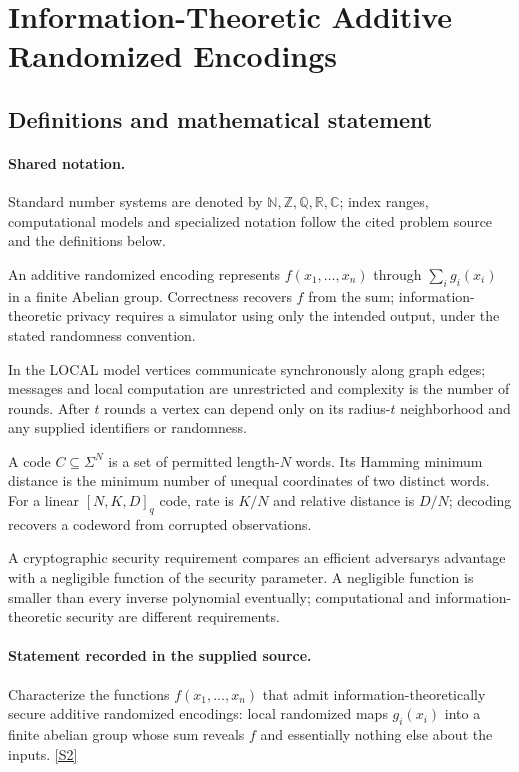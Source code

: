 \documentclass[11pt]{article}
\newcommand{\sref}[2]{\hyperlink{source:#1:#2}{[S#2]}}
\begin{document}
\section{Information-Theoretic Additive Randomized Encodings}\label{statement}

\subsection{Definitions and mathematical statement}

\paragraph{Shared notation.}Standard number systems are denoted by $\mathbb N,\mathbb Z,\mathbb Q,\mathbb R,\mathbb C$; index ranges, computational models and specialized notation follow the cited problem source and the definitions below.


An additive randomized encoding represents $f(x_1,\ldots,x_n)$ through $\sum_i g_i(x_i)$ in a finite Abelian group. Correctness recovers $f$ from the sum; information-theoretic privacy requires a simulator using only the intended output, under the stated randomness convention.

In the LOCAL model vertices communicate synchronously along graph edges; messages and local computation are unrestricted and complexity is the number of rounds. After $t$ rounds a vertex can depend only on its radius-$t$ neighborhood and any supplied identifiers or randomness.

A code $C\subseteq\Sigma^N$ is a set of permitted length-$N$ words. Its Hamming minimum distance is the minimum number of unequal coordinates of two distinct words. For a linear $[N,K,D]_q$ code, rate is $K/N$ and relative distance is $D/N$; decoding recovers a codeword from corrupted observations.

A cryptographic security requirement compares an efficient adversary\textquotesingle s advantage with a negligible function of the security parameter. A negligible function is smaller than every inverse polynomial eventually; computational and information-theoretic security are different requirements.
\paragraph{Statement recorded in the supplied source.}
Characterize the functions $f(x_1,\ldots,x_n)$ that admit information-theoretically secure additive randomized encodings: local randomized maps $g_i(x_i)$ into a finite abelian group whose sum reveals $f$ and essentially nothing else about the inputs. \sref{statement}{2}
\end{document}
